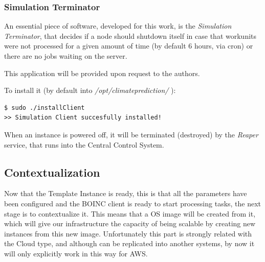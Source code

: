 \documentclass[journal abbreviation, manuscript]{copernicus}
\begin{document}
\subsubsection{Simulation Terminator}

An essential piece of software, developed for this work, is the \textit{Simulation Terminator}, that decides if a node should shutdown itself in case that workunits were not processed for a given amount of time (by default 6 hours, via cron) or there are no jobs waiting on the server.

This application will be provided upon request to the authors.


To install it (by default into \textit{/opt/climateprediction/} ):

\begin{verbatim}
$ sudo ./installClient
>> Simulation Client succesfully installed!
\end{verbatim}

When an instance is powered off, it will be terminated (destroyed) by the \textit{Reaper} service, that runs into the Central Control System.


\subsection{Contextualization}

Now that the Template Instance is ready, this is that all the parameters have been configured and the BOINC client is ready to start processing tasks, the next stage is to contextualize it. This means that a OS image will be created from it, which will give our infrastructure the capacity of being scalable by creating new instances from this new image. Unfortunately this part is strongly related with the Cloud type, and although can be replicated into another systems, by now it will only explicitly work in this way for AWS.
\end{document}
